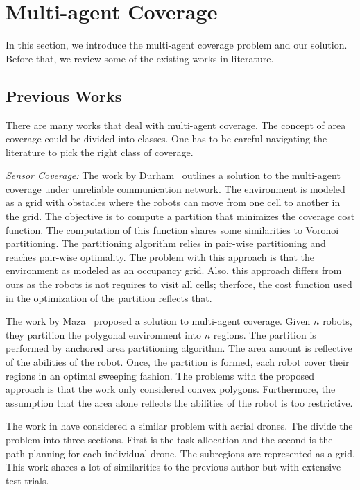 \documentclass[../main.tex]{subfiles}
\begin{document}
\chapter{Multi-agent Coverage}
\label{chapter:multi-agent_coverage}

In this section, we introduce the multi-agent coverage problem and our solution. Before that, we review some of the existing works in literature.


\section{Previous Works}
\label{sec:multi-agent_previous_works}
There are many works that deal with multi-agent coverage. The concept of area coverage could be divided into classes. One has to be careful navigating the literature to pick the right class of coverage.

\textit{Sensor Coverage:}
The work by Durham~\cite{durham2012discrete} outlines a solution to the  multi-agent coverage under unreliable communication network. The environment is modeled as a grid with obstacles where the robots can move from one cell to another in the grid. The objective is to compute a partition that minimizes the coverage cost function. The computation of this function shares some similarities to Voronoi partitioning. The partitioning algorithm relies in pair-wise partitioning and reaches pair-wise optimality. The problem with this approach is that the environment as modeled as an occupancy grid. Also, this approach differs from ours as the robots is not requires to visit all cells; therfore, the cost function used in the optimization of the partition reflects that.

The work by Maza~\cite{maza2007multiple} proposed a solution to multi-agent coverage. Given $n$ robots, they partition the polygonal environment into $n$ regions. The partition is performed by anchored area partitioning algorithm. The area amount is reflective of the abilities of the robot. Once, the partition is formed, each robot cover their regions in an optimal sweeping fashion. The problems with the proposed approach is that the work only considered convex polygons. Furthermore, the assumption that the area alone reflects the abilities of the robot is too restrictive.

The work in \cite{barrientos2011aerial} have considered a similar problem with aerial drones. The divide the problem into three sections. First is the task allocation and the second is the path planning for each individual drone. The subregions are represented as a grid. This work shares a lot of similarities to the previous author but with extensive test trials.
\end{document}
